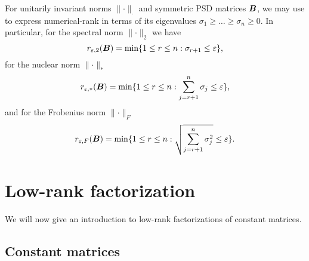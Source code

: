 For unitarily invariant norms $\lVert \cdot \rVert _{\cdot}$ and 
symmetric \gls{PSD} matrices $\boldsymbol{B}$, we may use
\cite[theorem~5]{mirsky1960truncation} to express \gls{numerical-rank} in terms
of its eigenvalues $\sigma_1 \geq \dots \geq \sigma_n \geq 0$.
In particular, for the spectral norm $\lVert \cdot \rVert _2$ we have
\begin{equation}
    r_{\varepsilon, 2}(\boldsymbol{B}) = \min \{1 \leq r \leq n: \sigma_{r+1} \leq \varepsilon \},
    \label{equ:3-nystrom-numerical-rank-spectral-norm}
\end{equation}
for the nuclear norm $\lVert \cdot \rVert _{\ast}$
\begin{equation}
    r_{\varepsilon, \ast}(\boldsymbol{B}) = \min \{1 \leq r \leq n: \sum_{j=r+1}^n \sigma_{j} \leq \varepsilon \},
    \label{equ:3-nystrom-numerical-rank-nuclear-norm}
\end{equation}
and for the Frobenius norm $\lVert \cdot \rVert _F$
\begin{equation}
    r_{\varepsilon, F}(\boldsymbol{B}) = \min \{1 \leq r \leq n: \sqrt{\sum_{j=r+1}^n \sigma_{j}^2} \leq \varepsilon \}.
    \label{equ:3-nystrom-numerical-rank-frobenius-norm}
\end{equation}


\section{Low-rank factorization}
\label{sec:3-nystrom-nystrom}

We will now give an introduction to low-rank factorizations of
constant matrices.

\subsection{Constant matrices}
\label{subsec:3-nystrom-factorization-constant-matrices}

